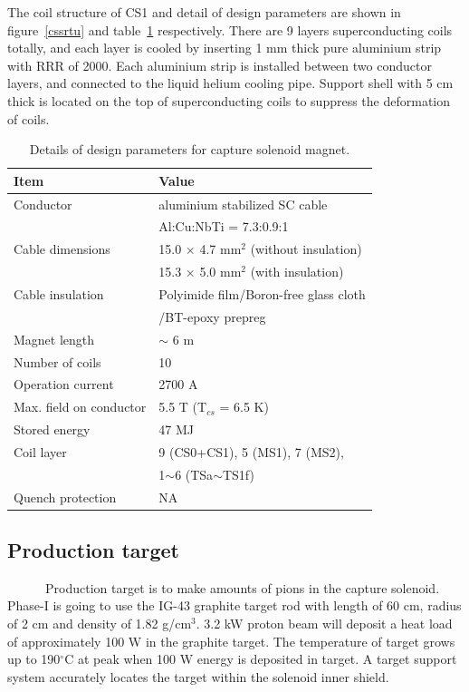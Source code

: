 The coil structure of CS1 and detail of design parameters are shown in figure~\ref{cssrtu} and table~\ref{desip} respectively.
There are 9 layers superconducting coils totally, and each layer is cooled by inserting 1 mm thick pure aluminium strip with RRR of 2000.
Each aluminium strip is installed between two conductor layers, and connected to the liquid helium cooling pipe.
Support shell with 5 cm thick is located on the top of superconducting coils to suppress the deformation of coils.
\begin{table}[H]
 \centering
 \begin{tabular}{ll} \hline \hline
  Item & Value \\ \hline
  Conductor & aluminium stabilized SC cable \\
   & Al:Cu:NbTi = 7.3:0.9:1 \\
  Cable dimensions & 15.0 $\times$ 4.7 mm$^2$ (without insulation) \\
   & 15.3 $\times$ 5.0 mm$^2$ (with insulation) \\
  Cable insulation & Polyimide film/Boron-free glass cloth \\
   & /BT-epoxy prepreg \\
  Magnet length & $\sim$ 6 m \\
  Number of coils & 10 \\
  Operation current & 2700 A \\
  Max. field on conductor & 5.5 T (T$_{cs}$ = 6.5 K) \\
  Stored energy & 47 MJ \\
  Coil layer & 9 (CS0+CS1), 5 (MS1), 7 (MS2), \\
   & 1$\sim$6 (TSa$\sim$TS1f) \\
  Quench protection & NA \\ \hline \hline
 \end{tabular}
 \caption{Details of design parameters for capture solenoid magnet.}
 \label{desip}
\end{table}

\subsection{Production target}
~~~~~~Production target is to make amounts of pions in the capture solenoid.
Phase-I is going to use the IG-43 graphite target rod with length of 60 cm, radius of 2 cm and density of 1.82 g/cm$^3$.
3.2 kW proton beam will deposit a heat load of approximately 100 W in the graphite target.
The temperature of target grows up to 190$^{\circ}$C at peak when 100 W energy is deposited in target.
A target support system accurately locates the target within the solenoid inner shield.

